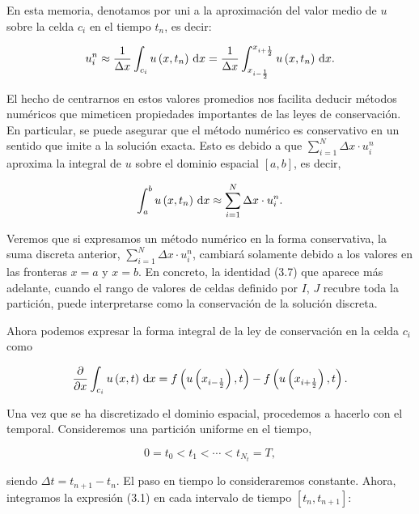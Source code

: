 En esta memoria, denotamos por uni a la aproximación del valor medio
de $u$ sobre la celda $c_{i}$ en el tiempo $t_{n}$, es decir:

\begin{equation*}
  u^{n}_{i}\approx
  \frac{1}{\Delta x}
  \int_{c_{i}}
  u\left(x,t_{n}\right)\dl x=
  \frac{1}{\Delta x}
  \int_{x_{i-\frac{1}{2}}}^{x_{i+\frac{1}{2}}}
  u\left(x,t_{n}\right)\dl x.
\end{equation*}

El hecho de centrarnos en estos valores promedios nos facilita
deducir métodos numéricos que mimeticen propiedades importantes de
las leyes de conservación.
En particular, se puede asegurar que el método numérico es
conservativo en un sentido que imite a la solución exacta.
Esto es debido a que $\sum_{i=1}^{N}\Delta x\cdot u^{n}_{i}$
aproxima la integral de $u$ sobre el dominio espacial
$\left[a,b\right]$, es decir,

\begin{equation*}
  \int_{a}^{b}
  u\left(x,t_{n}\right)\dl x\approx
  \sum_{i=1}^{N}
  \Delta x\cdot u^{n}_{i}.
\end{equation*}

Veremos que si expresamos un método numérico en la forma
conservativa, la suma discreta anterior,
$\sum_{i=1}^{N}\Delta x\cdot u^{n}_{i}$, cambiará solamente debido a
los valores en las fronteras $x=a$ y $x=b$.
En concreto, la identidad (3.7) que aparece más adelante, cuando el
rango de valores de celdas definido por $I$, $J$ recubre toda la
partición, puede interpretarse como la conservación de la solución
discreta.

Ahora podemos expresar la forma integral de la ley de conservación en
la celda $c_{i}$ como

\begin{equation*}
  \diffp{}{x}
  \int_{c_{i}}
  u\left(x,t\right)\dl x=
  f\left(u\left(x_{i-\frac{1}{2}}\right),t\right)-
  f\left(u\left(x_{i+\frac{1}{2}}\right),t\right).
\end{equation*}

Una vez que se ha discretizado el dominio espacial, procedemos a
hacerlo con el temporal.
Consideremos una partición uniforme en el tiempo,

\begin{equation*}
  0=t_{0}<
  t_{1}<
  \cdots<
  t_{N_{t}}=
  T,
\end{equation*}

siendo $\Delta t=t_{n+1}-t_{n}$.
El paso en tiempo lo consideraremos constante.
Ahora, integramos la expresión (3.1) en cada intervalo de tiempo
$\left[t_{n},t_{n+1}\right]$:


